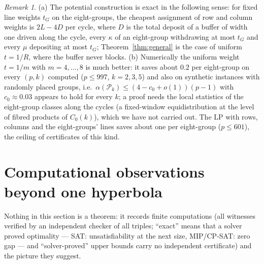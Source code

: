 \documentclass[11pt]{article}
\theoremstyle{remark}
\newtheorem{remark}[theorem]{Remark}
\newcommand{\Pset}{\mathcal{P}}
\begin{document}
\begin{remark}
(a) The potential construction is exact in the following sense: for fixed line weights $t_G$ on the eight-groups, the cheapest assignment of
row and column weights is $2L-4D$ per cycle, where $D$ is the total deposit of a buffer of width one driven along the cycle, every $\kappa$
of an eight-group withdrawing at most $t_G$ and every $\mu$ depositing at most $t_G$; Theorem~\ref{thm:general} is the case of uniform
$t=1/R$, where the buffer never blocks.  (b) Numerically the uniform weight $t=1/m$ with $m=4,\dots,8$ is much better: it saves about
$0.2$ per eight-group on every $(p,k)$ computed ($p\le997$, $k=2,3,5$) and also on synthetic instances with randomly placed groups, i.e.\
$\alpha(\Pset_k)\le(4-c_0+o(1))(p-1)$ with $c_0\approx0.03$ appears to hold for every $k$; a proof needs the local statistics of the eight-group
classes along the cycles (a fixed-window equidistribution at the level of fibred products of $C_0(k)$), which we have not carried out.  The
LP with rows, columns and the eight-groups' lines saves about one per eight-group ($p\le601$), the ceiling of certificates of this kind.
\end{remark}







\section{Computational observations beyond one hyperbola}\label{sec:beyond}

Nothing in this section is a theorem: it records finite computations (all witnesses verified by an independent checker of all
triples; ``exact'' means that a solver proved optimality --- SAT: unsatisfiability at the next size, MIP/CP-SAT: zero gap --- and
``solver-proved'' upper bounds carry no independent certificate) and the picture they suggest.
\end{document}
